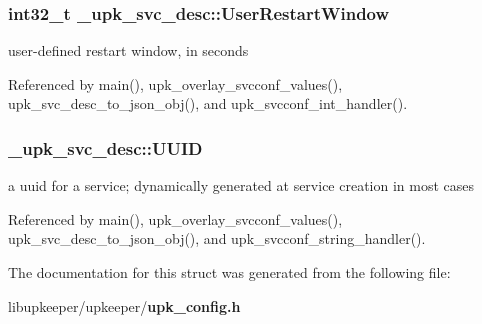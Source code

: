 \subsubsection[{UserRestartWindow}]{\setlength{\rightskip}{0pt plus 5cm}int32\_\-t {\bf \_\-upk\_\-svc\_\-desc::UserRestartWindow}}\label{struct__upk__svc__desc_aa821e5cd2987061ed057f52fb61538a7}
user-\/defined restart window, in seconds 

Referenced by main(), upk\_\-overlay\_\-svcconf\_\-values(), upk\_\-svc\_\-desc\_\-to\_\-json\_\-obj(), and upk\_\-svcconf\_\-int\_\-handler().

\subsubsection[{UUID}]{ {\bf \_\-upk\_\-svc\_\-desc::UUID}}\label{struct__upk__svc__desc_a8f7f1940251c598ea87a72c6ca1fd5cd}
a uuid for a service; dynamically generated at service creation in most cases 

Referenced by main(), upk\_\-overlay\_\-svcconf\_\-values(), upk\_\-svc\_\-desc\_\-to\_\-json\_\-obj(), and upk\_\-svcconf\_\-string\_\-handler().



The documentation for this struct was generated from the following file:\begin{DoxyCompactItemize}
\item 
libupkeeper/upkeeper/{\bf upk\_\-config.h}\end{DoxyCompactItemize}
